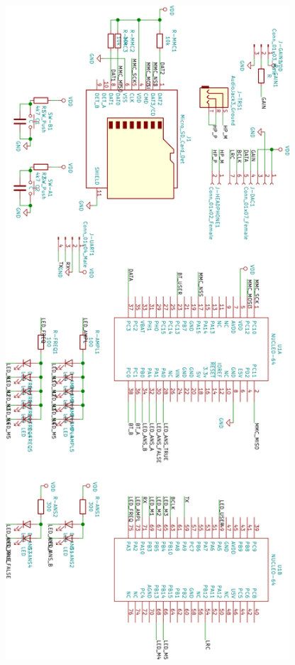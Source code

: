 \documentclass[12pt,]{article}
\begin{document}
	\begin{figure}[!ht]
		\centering
		\includegraphics[width=300pt]{images/board}
	\end{figure}
\end{document}
